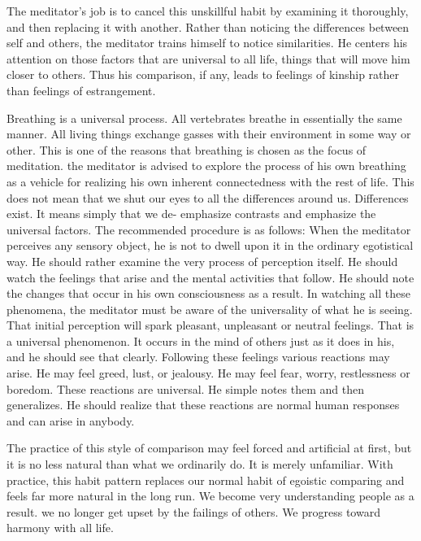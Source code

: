 The meditator's job is to cancel this unskillful habit by examining it
thoroughly, and then replacing it with another. Rather than noticing the
differences between self and others, the meditator trains himself to notice
similarities. He centers his attention on those factors that are universal to
all life, things that will move him closer to others. Thus his comparison, if
any, leads to feelings of kinship rather than feelings of estrangement.

Breathing is a universal process. All vertebrates breathe in essentially the
same manner. All living things exchange gasses with their environment in some
way or other. This is one of the reasons that breathing is chosen as the focus
of meditation. the meditator is advised to explore the process of his own
breathing as a vehicle for realizing his own inherent connectedness with the
rest of life. This does not mean that we shut our eyes to all the differences
around us. Differences exist. It means simply that we de- emphasize contrasts
and emphasize the universal factors. The recommended procedure is as follows:
When the meditator perceives any sensory object, he is not to dwell upon it in
the ordinary egotistical way. He should rather examine the very process of
perception itself. He should watch the feelings that arise and the mental
activities that follow. He should note the changes that occur in his own
consciousness as a result. In watching all these phenomena, the meditator must
be aware of the universality of what he is seeing. That initial perception will
spark pleasant, unpleasant or neutral feelings. That is a universal phenomenon.
It occurs in the mind of others just as it does in his, and he should see that
clearly. Following these feelings various reactions may arise. He may feel
greed, lust, or jealousy. He may feel fear, worry, restlessness or boredom.
These reactions are universal. He simple notes them and then generalizes. He
should realize that these reactions are normal human responses and can arise in
anybody.

The practice of this style of comparison may feel forced and artificial at
first, but it is no less natural than what we ordinarily do. It is merely
unfamiliar. With practice, this habit pattern replaces our normal habit of
egoistic comparing and feels far more natural in the long run. We become very
understanding people as a result. we no longer get upset by the failings of
others. We progress toward harmony with all life.
